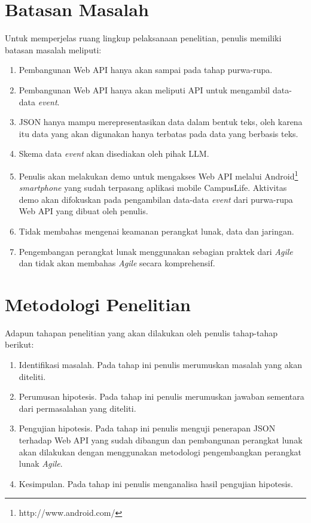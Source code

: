 \documentclass[a4paper, 12pt]{report}
\begin{document}
\section{Batasan Masalah}
\onehalfspacing Untuk memperjelas ruang lingkup pelaksanaan penelitian, penulis memiliki batasan masalah meliputi:
\onehalfspacing
\begin{enumerate}
  \item Pembangunan Web API hanya akan sampai pada tahap purwa-rupa.
  \item Pembangunan Web API hanya akan meliputi API untuk mengambil data-data \textit{event}.
  \item JSON hanya mampu merepresentasikan data dalam bentuk teks, oleh karena itu data yang akan digunakan hanya terbatas pada data yang berbasis teks.
  \item Skema data \textit{event} akan disediakan oleh pihak LLM.
  \item Penulis akan melakukan demo untuk mengakses Web API melalui Android\footnote{http://www.android.com/} \textit{smartphone} yang sudah terpasang aplikasi mobile CampusLife. Aktivitas demo akan difokuskan pada pengambilan  data-data \textit{event} dari purwa-rupa Web API yang dibuat oleh penulis.
  \item Tidak membahas mengenai keamanan perangkat lunak, data dan jaringan.
  \item Pengembangan perangkat lunak menggunakan sebagian praktek dari \textit{Agile} dan tidak akan membahas \textit{Agile} secara komprehensif.
\end{enumerate}

\section{Metodologi Penelitian}
\onehalfspacing Adapun tahapan penelitian yang akan dilakukan oleh penulis tahap-tahap berikut:
\begin{enumerate}
  \item Identifikasi masalah. Pada tahap ini penulis merumuskan masalah yang akan diteliti.
  \item Perumusan hipotesis. Pada tahap ini penulis merumuskan jawaban sementara dari permasalahan yang diteliti.
  \item Pengujian hipotesis. Pada tahap ini penulis menguji penerapan JSON terhadap Web API yang sudah dibangun dan pembangunan perangkat lunak akan dilakukan dengan menggunakan metodologi pengembangkan perangkat lunak \textit{Agile}. 
  \item Kesimpulan. Pada tahap ini penulis menganalisa hasil pengujian hipotesis.
\end{enumerate}
\end{document}
